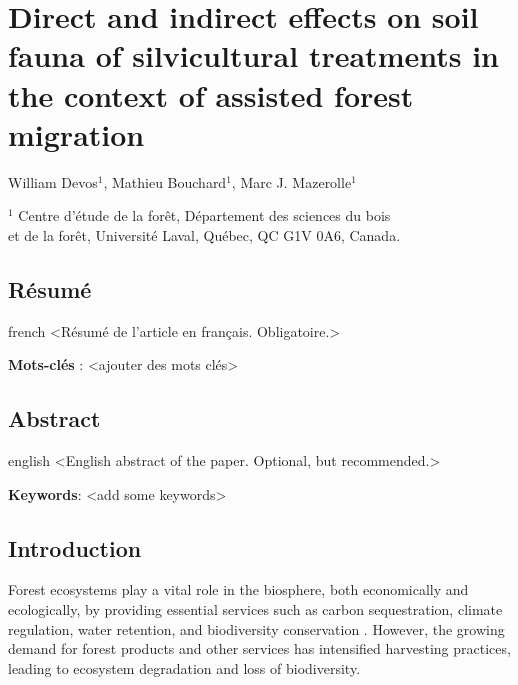 \chapter{Direct and indirect effects on soil fauna of silvicultural treatments in the context of assisted forest migration}     %
\label{chapitre1-articles}    

William Devos$^1$, Mathieu Bouchard$^1$, Marc J. Mazerolle$^1$

$^1$ Centre d'étude de la forêt, Département des sciences du bois \\ 
et de la forêt, Université Laval, Québec, QC G1V 0A6, Canada. \\ 

\clearpage

\section*{Résumé}
\label{sec:resume1}

\begin{otherlanguage*}{french}
  <Résumé de l'article en français. Obligatoire.>

  \textbf{Mots-clés} : <ajouter des mots clés>
\end{otherlanguage*}

\clearpage

\section*{Abstract}
\label{sec:abstract1}

\begin{otherlanguage*}{english}
  <English abstract of the paper. Optional, but recommended.>

\textbf{Keywords}: <add some keywords> 
\end{otherlanguage*}

\cleardoublepage

\section*{Introduction}
\label{sec:intro1}


Forest ecosystems play a vital role in the biosphere, both economically and ecologically, by providing essential services such as carbon sequestration, climate regulation, water retention, and biodiversity conservation \citep{Balvanera2006Quantifyingevidence,Diaz2006BiodiversityLoss,Canadell2008Managingforests,Pawson2013Plantationforests}. 
However, the growing demand for forest products and other services has intensified harvesting practices, leading to ecosystem degradation and loss of biodiversity\citep{Bengtsson2000Biodiversitydisturbances,Sala2000Globalbiodiversity,Foley2005GlobalConsequences,Naeem2012functionsbiological}. 

